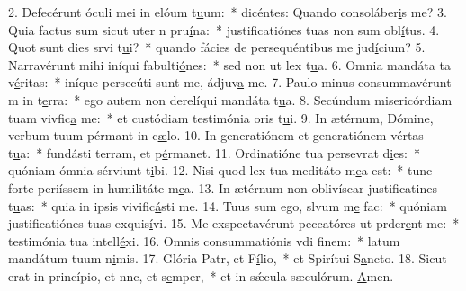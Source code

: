 2. Defecérunt óculi mei in elóum t\uline{u}um:~* dicéntes: Quando consoláber\uline{i}s me?
3. Quia factus sum sicut uter n pru\uline{í}na:~* justificatiónes tuas non sum obl\uline{í}tus.
4. Quot sunt dies srvi t\uline{u}i?~* quando fácies de persequéntibus me jud\uline{í}cium?
5. Narravérunt mihi iníqui fabulti\uline{ó}nes:~* sed non ut lex t\uline{u}a.
6. Omnia mandáta ta v\uline{é}ritas:~* iníque persecúti sunt me, ádjuv\uline{a} me.
7. Paulo minus consummavérunt m in t\uline{e}rra:~* ego autem non derelíqui mandáta t\uline{u}a.
8. Secúndum misericórdiam tuam vivfic\uline{a} me:~* et custódiam testimónia oris t\uline{u}i.
9. In ætérnum, Dómine, verbum tuum pérmant in c\uline{æ}lo.
10. In generatiónem et generatiónem vértas t\uline{u}a:~* fundásti terram, et p\uline{é}rmanet.
11. Ordinatióne tua persevrat d\uline{i}es:~* quóniam ómnia sérviunt t\uline{i}bi.
12. Nisi quod lex tua meditáto m\uline{e}a est:~* tunc forte periíssem in humilitáte m\uline{e}a.
13. In ætérnum non oblivíscar justificatines t\uline{u}as:~* quia in ipsis vivific\uline{á}sti me.
14. Tuus sum ego, slvum m\uline{e} fac:~* quóniam justificatiónes tuas exquis\uline{í}vi.
15. Me exspectavérunt peccatóres ut prder\uline{e}nt me:~* testimónia tua intell\uline{é}xi.
16. Omnis consummatiónis vdi f\uline{i}nem:~* latum mandátum tuum n\uline{i}mis.
17. Glória Patr, et F\uline{í}lio,~* et Spirítui S\uline{a}ncto.
18. Sicut erat in princípio, et nnc, et s\uline{e}mper,~* et in sǽcula sæculórum. \uline{A}men.
